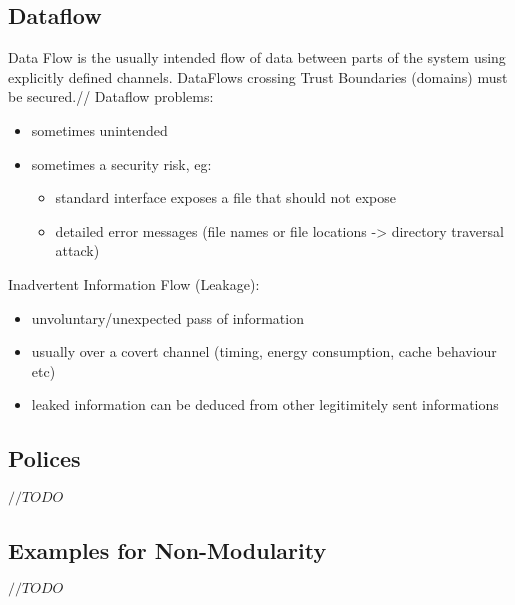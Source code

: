 \documentclass[a4paper, 12pt]{article}
\begin{document}
\subsection{Dataflow}
Data Flow is the usually intended flow of data between parts of the system using explicitly defined channels. DataFlows crossing Trust Boundaries (domains) must be secured.//
Dataflow problems:
\begin{itemize}
\item sometimes unintended
\item sometimes a security risk, eg:
\begin{itemize}
\item standard interface exposes a file that should not expose
\item detailed error messages (file names or file locations -> directory traversal attack)
\end{itemize} 
\end{itemize}

Inadvertent Information Flow (Leakage):\\
\begin{itemize}
\item unvoluntary/unexpected pass of information
\item usually over a covert channel (timing, energy consumption, cache behaviour etc)
\item leaked information can be deduced from other legitimitely sent informations
\end{itemize}
\subsection{Polices}
$ //TODO $
\subsection{Examples for Non-Modularity}
$ //TODO $
\end{document}
